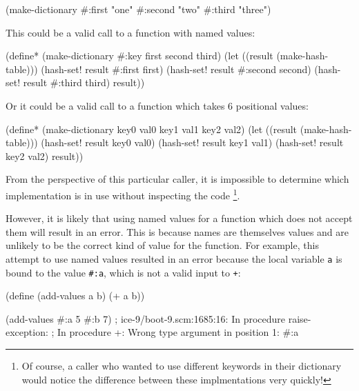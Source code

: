 \begin{pygmented}[lang=lisp]
(make-dictionary #:first  "one"
                 #:second "two"
                 #:third  "three")
\end{pygmented}

This could be a valid call to a function with named values:

\begin{pygmented}[lang=lisp]
(define* (make-dictionary #:key first second third)
  (let ((result (make-hash-table)))
    (hash-set! result #:first  first)
    (hash-set! result #:second second)
    (hash-set! result #:third  third)
    result))
\end{pygmented}

Or it could be a valid call to a function which takes 6 positional values:

\begin{pygmented}[lang=lisp]
(define* (make-dictionary key0 val0
                          key1 val1
                          key2 val2)
  (let ((result (make-hash-table)))
    (hash-set! result key0 val0)
    (hash-set! result key1 val1)
    (hash-set! result key2 val2)
    result))
\end{pygmented}

From the perspective of this particular caller, it is impossible to determine which
implementation is in use without inspecting the code
\footnote{
	Of course, a caller who wanted to use different keywords in their dictionary would
	notice the difference between these implmentations very quickly!
}.

However, it is likely that using named values for a function which does not accept them
will result in an error.
This is because names are themselves values and are unlikely to be the correct kind of
value for the function.
For example, this attempt to use named values resulted in an error because the local
variable \texttt{a} is bound to the value \texttt{\#:a}, which is not a valid input to
\texttt{+}:

\begin{pygmented}[lang=lisp]
(define (add-values a b)
  (+ a b))

(add-values #:a 5 #:b 7)
; ice-9/boot-9.scm:1685:16: In procedure raise-exception:
; In procedure +: Wrong type argument in position 1: #:a
\end{pygmented}


